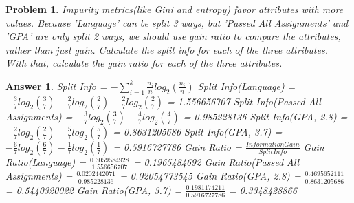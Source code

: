 \documentclass[11pt]{article}
\theoremstyle{description}
\newtheorem{problem}{Problem}
\theoremstyle{break}
\newtheorem*{answer}{Answer}
\begin{document}
    \begin{problem}
        Impurity metrics(like Gini and entropy) favor attributes with more values.
        Because 'Language' can be split 3 ways, but 'Passed All Assignments' and 'GPA' are only
        split 2 ways, we should use gain ratio to compare the attributes, rather than just gain.
        Calculate the split info for each of the three attributes.
        With that, calculate the gain ratio for each of the three attributes.
    \end{problem}
    \begin{answer}
        Split Info = $-\sum_{i=1}^{k} \frac{n_{i}}{n}log_{2}(\frac{n_{i}}{n})$\newline
        Split Info(Language) = $-\frac{3}{7}log_{2}(\frac{3}{7}) - \frac{2}{7}log_{2}(\frac{2}{7}) - \frac{2}{7}log_{2}(\frac{2}{7})$\newline
        = 1.556656707\newline
        Split Info(Passed All Assignments) = $-\frac{3}{7}log_{2}(\frac{3}{7}) - \frac{4}{7}log_{
            2}(\frac{4}{7})$\newline
        = 0.985228136\newline
        Split Info(GPA, 2.8) = $-\frac{2}{7}log_{2}(\frac{2}{7}) - \frac{5}{7}log_{2}(\frac{5}{7})$\newline
        = 0.8631205686\newline
        Split Info(GPA, 3.7) = $-\frac{6}{7}log_{2}(\frac{6}{7}) - \frac{1}{7}log_{2}(\frac{1}{7})$\newline
        = 0.5916727786\newline
        Gain Ratio = $\frac{Information Gain}{Split Info}$\newline
        Gain Ratio(Language) = $\frac{0.3059584928}{1.556656707}$\newline
        = 0.1965484692\newline
        Gain Ratio(Passed All Assignments) = $\frac{0.0202442071}{0.985228136}$\newline
        = 0.02054773545\newline
        Gain Ratio(GPA, 2.8) = $\frac{0.4695652111}{0.8631205686}$\newline
        = 0.5440320022\newline
        Gain Ratio(GPA, 3.7) = $\frac{0.1981174211}{0.5916727786}$\newline
        = 0.3348428866\newline
    \end{answer}
\end{document}
